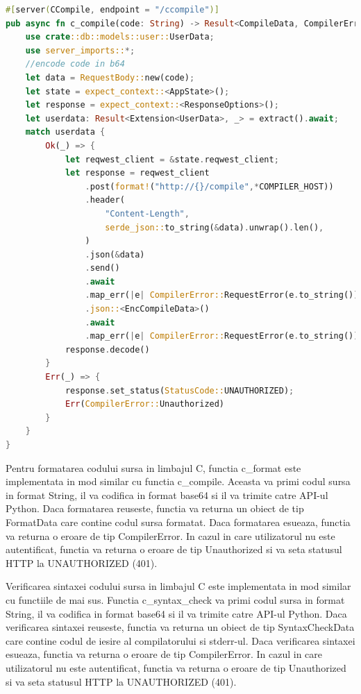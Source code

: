\documentclass[titlepage,12pt]{article}
\DeclareRobustCommand{\code}[1]{{\ttfamily\small #1}}
\begin{document}
\begin{lstlisting}[language=Rust,caption={API Rust pentru compilarea codului C},label={lst:compilerustapi}]
#[server(CCompile, endpoint = "/ccompile")]
pub async fn c_compile(code: String) -> Result<CompileData, CompilerError> {
    use crate::db::models::user::UserData;
    use server_imports::*;
    //encode code in b64
    let data = RequestBody::new(code);
    let state = expect_context::<AppState>();
    let response = expect_context::<ResponseOptions>();
    let userdata: Result<Extension<UserData>, _> = extract().await;
    match userdata {
        Ok(_) => {
            let reqwest_client = &state.reqwest_client;
            let response = reqwest_client
                .post(format!("http://{}/compile",*COMPILER_HOST))
                .header(
                    "Content-Length",
                    serde_json::to_string(&data).unwrap().len(),
                )
                .json(&data)
                .send()
                .await
                .map_err(|e| CompilerError::RequestError(e.to_string()))?
                .json::<EncCompileData>()
                .await
                .map_err(|e| CompilerError::RequestError(e.to_string()))?;
            response.decode()
        }
        Err(_) => {
            response.set_status(StatusCode::UNAUTHORIZED);
            Err(CompilerError::Unauthorized)
        }
    }
}
\end{lstlisting}

Pentru formatarea codului sursa in limbajul C, functia \code{c\_format} este implementata in mod similar cu functia \code{c\_compile}. Aceasta va primi codul sursa in format \code{String}, il va codifica in format \code{base64} si il va trimite catre API-ul Python. Daca formatarea reuseste, functia va returna un obiect de tip \code{FormatData} care contine codul sursa formatat. Daca formatarea esueaza, functia va returna o eroare de tip \code{CompilerError}. In cazul in care utilizatorul nu este autentificat, functia va returna o eroare de tip \code{Unauthorized} si va seta statusul HTTP la \code{UNAUTHORIZED (401)}.

Verificarea sintaxei codului sursa in limbajul C este implementata in mod similar cu functiile de mai sus. Functia \code{c\_syntax\_check} va primi codul sursa in format \code{String}, il va codifica in format \code{base64} si il va trimite catre API-ul Python. Daca verificarea sintaxei reuseste, functia va returna un obiect de tip \code{SyntaxCheckData} care contine codul de iesire al compilatorului si stderr-ul. Daca verificarea sintaxei esueaza, functia va returna o eroare de tip \code{CompilerError}. In cazul in care utilizatorul nu este autentificat, functia va returna o eroare de tip \code{Unauthorized} si va seta statusul HTTP la \code{UNAUTHORIZED (401)}.
\end{document}
